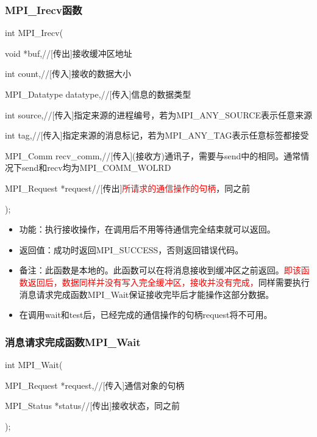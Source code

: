 \documentclass[UTF8]{article}%
\begin{document}
\subsubsection{MPI\_Irecv函数}

int MPI\_Irecv(

    \qquad void            *buf,//[传出]接收缓冲区地址

    \qquad int             count,//[传入]接收的数据大小

    \qquad MPI\_Datatype   datatype,//[传入]信息的数据类型

    \qquad int             source,//[传入]指定来源的进程编号，若为MPI\_ANY\_SOURCE表示任意来源

    \qquad int             tag,//[传入]指定来源的消息标记，若为MPI\_ANY\_TAG表示任意标签都接受

    \qquad MPI\_Comm       recv\_comm,//[传入](接收方)通讯子，需要与send中的相同。通常情况下send和recv均为MPI\_COMM\_WOLRD

    \qquad MPI\_Request    *request//[传出]\textcolor{red}{所请求的通信操作的句柄}，同之前

);

\begin{itemize}
    \item 功能：执行接收操作，在调用后不用等待通信完全结束就可以返回。
    \item 返回值：成功时返回MPI\_SUCCESS，否则返回错误代码。
    \item 备注：此函数是本地的。此函数可以在将消息接收到缓冲区之前返回。\textcolor{red}{即该函数返回后，数据同样并没有写入完全缓冲区，接收并没有完成，}同样需要执行消息请求完成函数MPI\_Wait保证接收完毕后才能操作这部分数据。
    \item 在调用wait和test后，已经完成的通信操作的句柄request将不可用。
\end{itemize}

\subsubsection{消息请求完成函数MPI\_Wait}

int MPI\_Wait(

    \qquad MPI\_Request *request,//[传入]通信对象的句柄

    \qquad MPI\_Status  *status//[传出]接收状态，同之前

);
\end{document}
